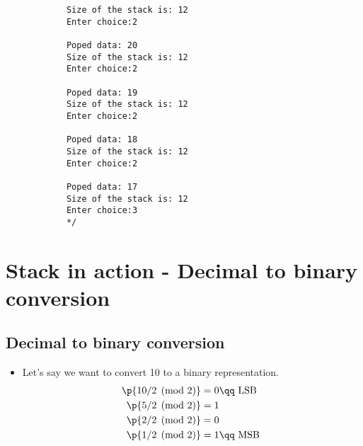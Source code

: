 \begin{itemize}
\begin{verbatim}
            Size of the stack is: 12
            Enter choice:2

            Poped data: 20
            Size of the stack is: 12
            Enter choice:2

            Poped data: 19
            Size of the stack is: 12
            Enter choice:2

            Poped data: 18
            Size of the stack is: 12
            Enter choice:2

            Poped data: 17
            Size of the stack is: 12
            Enter choice:3
            */
        \end{verbatim}
\end{itemize}

\section{Stack in action - Decimal to binary conversion}
\subsection{Decimal to binary conversion}
\begin{itemize}
    \item Let's say we want to convert 10 to a binary representation. 
        \begin{align*}
            \p{10 / 2 \pmod{2}} &=  0 \qq \text{ LSB }\\ 
            \p{5/2\pmod{2}}  &= 1 \\  
            \p{2/2\pmod{2}} &= 0 \\ 
            \p{1/2\pmod{2}} &= 1 \qq \text{ MSB }\\ 
        \end{align*}
\end{itemize}

